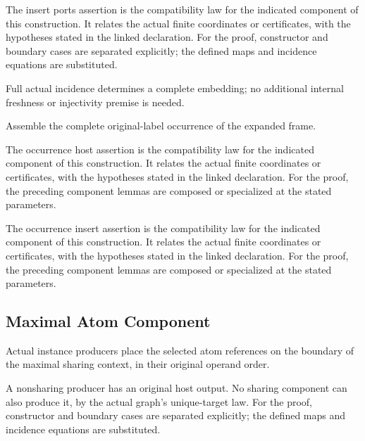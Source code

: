 The insert ports assertion is the compatibility law for the indicated component of this construction. It relates the actual finite coordinates or certificates, with the hypotheses stated in the linked declaration.
For the proof, constructor and boundary cases are separated explicitly; the defined maps and incidence equations are substituted.
\par{}

Full actual incidence determines a complete embedding; no additional internal freshness or injectivity premise is needed.
\par{}

Assemble the complete original-label occurrence of the expanded frame.
\par{}

The occurrence host assertion is the compatibility law for the indicated component of this construction. It relates the actual finite coordinates or certificates, with the hypotheses stated in the linked declaration.
For the proof, the preceding component lemmas are composed or specialized at the stated parameters.
\par{}

The occurrence insert assertion is the compatibility law for the indicated component of this construction. It relates the actual finite coordinates or certificates, with the hypotheses stated in the linked declaration.
For the proof, the preceding component lemmas are composed or specialized at the stated parameters.
\par{}

\subsection{Maximal Atom Component}
Actual instance producers place the selected atom references on the boundary of the maximal sharing context, in their original operand order.

A nonsharing producer has an original host output. No sharing component can also produce it, by the actual graph's unique-target law.
For the proof, constructor and boundary cases are separated explicitly; the defined maps and incidence equations are substituted.
\par{}

